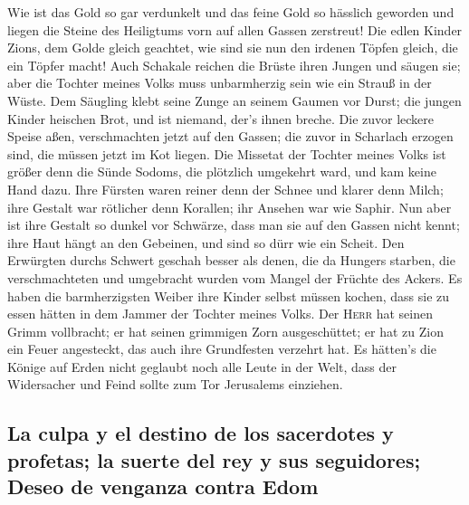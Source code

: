  Wie ist das Gold so gar verdunkelt und das feine Gold so
hässlich geworden und liegen die Steine des Heiligtums vorn auf allen
Gassen zerstreut!  Die edlen Kinder Zions, dem Golde
gleich geachtet, wie sind sie nun den irdenen Töpfen gleich, die ein
Töpfer macht!  Auch Schakale reichen die Brüste ihren
Jungen und säugen sie; aber die Tochter meines Volks muss unbarmherzig
sein wie ein Strauß in der Wüste.  Dem Säugling klebt
seine Zunge an seinem Gaumen vor Durst; die jungen Kinder heischen Brot,
und ist niemand, der's ihnen breche.  Die zuvor leckere
Speise aßen, verschmachten jetzt auf den Gassen; die zuvor in Scharlach
erzogen sind, die müssen jetzt im Kot liegen.  Die
Missetat der Tochter meines Volks ist größer denn die Sünde Sodoms, die
plötzlich umgekehrt ward, und kam keine Hand dazu.  Ihre
Fürsten waren reiner denn der Schnee und klarer denn Milch; ihre Gestalt
war rötlicher denn Korallen; ihr Ansehen war wie Saphir. 
Nun aber ist ihre Gestalt so dunkel vor Schwärze, dass man sie auf den
Gassen nicht kennt; ihre Haut hängt an den Gebeinen, und sind so dürr
wie ein Scheit.  Den Erwürgten durchs Schwert geschah
besser als denen, die da Hungers starben, die verschmachteten und
umgebracht wurden vom Mangel der Früchte des Ackers.  Es
haben die barmherzigsten Weiber ihre Kinder selbst müssen kochen, dass
sie zu essen hätten in dem Jammer der Tochter meines Volks.
 Der \textsc{Herr} hat seinen Grimm vollbracht; er hat
seinen grimmigen Zorn ausgeschüttet; er hat zu Zion ein Feuer
angesteckt, das auch ihre Grundfesten verzehrt hat.  Es
hätten's die Könige auf Erden nicht geglaubt noch alle Leute in der
Welt, dass der Widersacher und Feind sollte zum Tor Jerusalems
einziehen.

\hypertarget{la-culpa-y-el-destino-de-los-sacerdotes-y-profetas-la-suerte-del-rey-y-sus-seguidores-deseo-de-venganza-contra-edom}{%
\subsection{La culpa y el destino de los sacerdotes y profetas; la
suerte del rey y sus seguidores; Deseo de venganza contra
Edom}\label{la-culpa-y-el-destino-de-los-sacerdotes-y-profetas-la-suerte-del-rey-y-sus-seguidores-deseo-de-venganza-contra-edom}}

